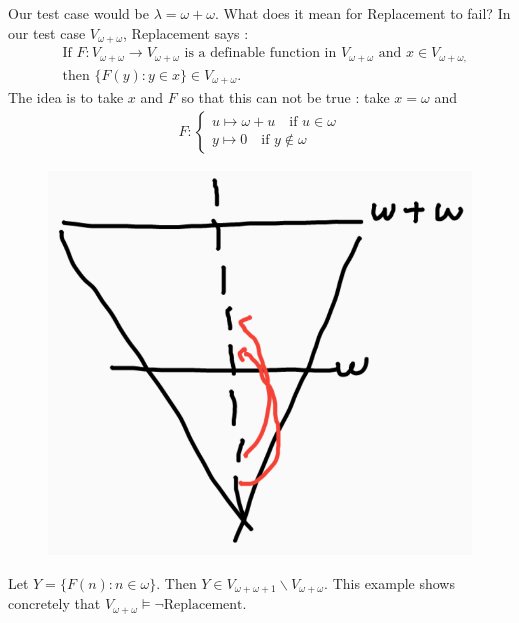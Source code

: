 \documentclass[12pt,a4paper]{article}
\begin{document}
\quad Our test case would be $\lambda =\omega + \omega$. What does it mean for Replacement to fail? In our test case $V_{\omega + \omega}$, Replacement says :
\begin{align*}
& \text{If } F: V_{\omega + \omega} \rightarrow V_{\omega + \omega} \text{ is a definable function in } V_{\omega + \omega} \text{ and } x\in V_{\omega + \omega,}\\
& \text{then } \{F(y) : y\in x\} \in V_{\omega + \omega}.
\end{align*}
The idea is to take $x$ and $F$ so that this can not be true : take $x= \omega$ and
\begin{align*}
F : \begin{cases} 
u \mapsto \omega + u \quad \text{if } u\in \omega\\
y\mapsto 0 \quad \text{if } y\not\in \omega
\end{cases}
\end{align*}

\begin{figure}[h]
\begin{center}
    \includegraphics[scale=0.25]{2}
\end{center}
\end{figure}

Let $Y = \{F(n): n\in \omega\}$. Then $Y\in V_{\omega+\omega +1} \backslash V_{\omega + \omega}$. This example shows concretely that $V_{\omega+\omega} \models \neg \text{Replacement}$.
\s
\end{document}
